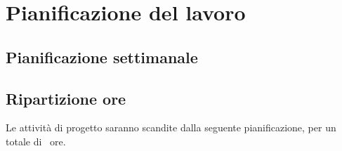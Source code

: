 
\section{Pianificazione del lavoro}

\subsection{Pianificazione settimanale}
	\prospettoSettimanale
	\newpage
	
\subsection{Ripartizione ore}
	Le attività di progetto saranno scandite dalla seguente pianificazione, per un totale di \totaleOre\ ore.
	\begin{center}
	    
	\end{center}
